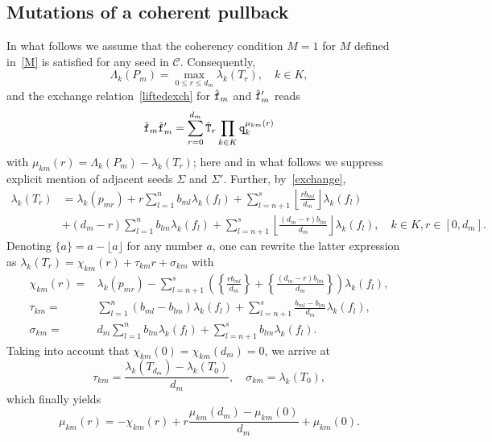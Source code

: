 \documentclass{amsart}
\theoremstyle{definition}
\theoremstyle{remark}
\numberwithin{equation}{section}
\numberwithin{theorem}{section}
\def\CC{{\mathcal C}}
\def\ttf{{\tt f}}
\def\ttq{{\tt q}}
\def\ttT{{\tt T}}
\begin{document}
\subsection{Mutations of a coherent pullback}
In what follows we assume that the coherency condition $M=1$ for $M$ defined in~\eqref{M} is satisfied for any seed in 
$\CC$. Consequently, 
\begin{equation}\label{cohcond}
\Lambda_k(P_m)=\max_{0\le r\le d_m}\lambda_k(T_r), \quad k\in K, 
\end{equation}
and the exchange relation~\eqref{liftedexch} for $\hat\ttf_m$ and $\hat\ttf_m'$ reads
\begin{equation}\label{pullex} 
\hat\ttf_m\hat\ttf_m'=\sum_{r=0}^{d_m} \hat\ttT_r\prod_{k\in K}\ttq_k^{\mu_{km}(r)}
\end{equation}
with $\mu_{km}(r)=\Lambda_k(P_m)-\lambda_k(T_r)$;
here and in what follows we suppress explicit mention of adjacent seeds $\Sigma$ and $\Sigma'$. Further,
by~\eqref{exchange}, 
\begin{align*}
\lambda_k(T_r)&=\lambda_k(p_{mr})+r\sum_{l=1}^n b_{ml}\lambda_k(f_l)+\sum_{l=n+1}^s 
\left\lfloor \frac{rb_{ml}}{d_m}\right\rfloor\lambda_k(f_l)\\
& +(d_m-r)\sum_{l=1}^n b_{lm}\lambda_k(f_l)+\sum_{l=n+1}^s 
\left\lfloor \frac{(d_m-r)b_{lm}}{d_m}\right\rfloor\lambda_k(f_l),\quad k\in K, r\in[0,d_m].
\end{align*}
Denoting $\{a\}=a-\lfloor a\rfloor$ for any number $a$, one can rewrite the latter expression as
$\lambda_k(T_r)=\chi_{km}(r)+\tau_{km}r+\sigma_{km}$ with
\begin{equation}\label{lamcoef}
\begin{aligned}
\chi_{km}(r)=&\lambda_k(p_{mr})-
\sum_{l=n+1}^s\left(\left\{\frac{rb_{ml}}{d_m}\right\}+\left\{\frac{(d_m-r)b_{lm}}{d_m}\right\}\right)\lambda_k(f_l),\\
\tau_{km}=&\sum_{l=1}^n(b_{ml}-b_{lm})\lambda_k(f_l)+\sum_{l=n+1}^s\frac{b_{ml}-b_{lm}}{d_m}\lambda_k(f_l),\\
\sigma_{km}=&d_m\sum_{l=1}^n b_{lm}\lambda_k(f_l)+\sum_{l=n+1}^s b_{lm}\lambda_k(f_l).
\end{aligned} 
\end{equation}
Taking into account that $\chi_{km}(0)=\chi_{km}(d_m)=0$, we arrive at
\begin{equation*}%
\tau_{km}=\frac{\lambda_k(T_{d_m})-\lambda_k(T_0)}{d_m}, \quad \sigma_{km}=\lambda_k(T_0),
\end{equation*}
which finally yields
\begin{equation}\label{mutr}
\mu_{km}(r)=-\chi_{km}(r)+r\frac{\mu_{km}(d_m)-\mu_{km}(0)}{d_m}+\mu_{km}(0).
\end{equation}
\end{document}
